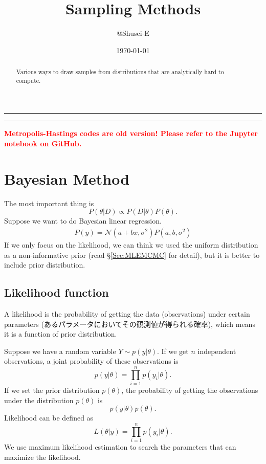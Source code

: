 \documentclass[a4paper,10.5pt,uplatex]{jsarticle}  %
\begin{document}
\title{Sampling Methods}
\author{@Shusei-E}
\date{\today}
\maketitle
\begin{abstract}
Various ways to draw samples from distributions that are analytically hard to compute.
\end{abstract}

\noindent\rule{17.5cm}{1.7pt}
\vspace{-1.3cm}
\tableofcontents
\noindent\rule{17.5cm}{1.7pt}

\textbf{\Large \textcolor{red}{Metropolis-Hastings codes are old version! Please refer to the Jupyter notebook on GitHub.}}

\section{Bayesian Method}
The most important thing is \begin{equation}P(\theta|D) \propto P(D|\theta) P(\theta).\label{Eq:Bayes}\end{equation} Suppose we want to do Bayesian linear regression.
\begin{align}
  P(y) = \mathcal{N}(a+bx, \sigma^2) P(a, b, \sigma^2)
\end{align}
If we only focus on the likelihood, we can think we used the uniform distribution as a non-informative prior (read \S\ref{Sec:MLEMCMC} for detail), but it is better to include prior distribution.


\subsection{Likelihood function}
A likelihood is the probability of getting the data (observations) under certain parameters (あるパラメータにおいてその観測値が得られる確率), which means it is a function of prior distribution.\par
Suppose we have a random variable $Y \sim p(y|\theta)$. If we get $n$ independent observations, a joint probability of these observations is $$p(y|\theta) = \prod_{i=1}^{n} p(y_i | \theta).$$ If we set the prior distribution $p(\theta)$, the probability of getting the observations under the distribution $p(\theta)$ is $$p(y|\theta)p(\theta).$$Likelihood can be defined as $$L(\theta|y) = \prod_{i=1}^{n} p(y_i|\theta).$$ We use maximum likelihood estimation to search the parameters that can maximize the likelihood.
\end{document}

